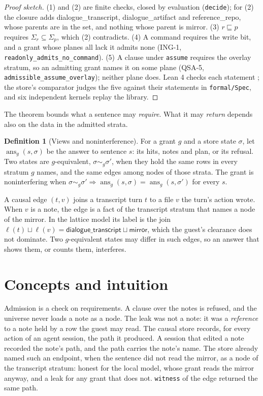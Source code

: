 \documentclass[11pt]{article}
\theoremstyle{plain}
\theoremstyle{definition}
\newtheorem{definition}[theorem]{Definition}
\theoremstyle{remark}
\newcommand{\lean}[1]{\texttt{#1}}
\newcommand{\str}[1]{\textsf{#1}}
\begin{document}
\begin{proof}[Proof sketch]
(1) and (2) are finite checks, closed by evaluation (\lean{decide}); for (2) the closure adds
\str{dialogue\_transcript}, \str{dialogue\_artifact} and \str{reference\_repo}, whose parents are
in the set, and nothing whose parent is \str{mirror}. (3) $r \sqsubseteq p$ requires
$\Sigma_r \subseteq \Sigma_p$, which (2) contradicts. (4) A command requires the write bit, and a
grant whose planes all lack it admits none (ING-1, \lean{readonly\_admits\_no\_command}). (5) A
clause under \texttt{assume} requires the overlay stratum, so an admitting grant names it on some
plane (QSA-5, \lean{admissible\_assume\_overlay}); neither plane does. Lean 4 checks each statement
\citep{demoura2021lean4,mathlib2020}; the store's comparator judges the five against their
statements in \texttt{formal/Spec}, and six independent kernels replay the library.
\end{proof}

The theorem bounds what a sentence may \emph{require}. What it may \emph{return} depends also on
the data in the admitted strata.

\begin{definition}[Views and noninterference]
For a grant $g$ and a store state $\sigma$, let $\operatorname{ans}_g(s, \sigma)$ be the answer to
sentence $s$: its hits, notes and plan, or its refusal. Two states are $g$-equivalent,
$\sigma \sim_g \sigma'$, when they hold the same rows in every stratum $g$ names, and the same
edges among nodes of those strata. The grant is noninterfering when
$\sigma \sim_g \sigma' \Rightarrow \operatorname{ans}_g(s, \sigma) = \operatorname{ans}_g(s,
\sigma')$ for every $s$.
\end{definition}

A causal edge $(t, v)$ joins a transcript turn $t$ to a file $v$ the turn's action wrote. When $v$
is a note, the edge is a fact of the transcript stratum that names a node of the mirror. In the
lattice model its label is the join $\ell(t) \sqcup \ell(v) = \str{dialogue\_transcript} \sqcup
\str{mirror}$, which the guest's clearance does not dominate. Two $g$-equivalent states may differ
in such edges, so an answer that shows them, or counts them, interferes.

\section{Concepts and intuition}

Admission is a check on requirements. A clause over the notes is refused, and the universe never
loads a note as a node. The leak was not a note: it was a \emph{reference} to a note held by a row
the guest may read. The causal store records, for every action of an agent session, the path it
produced. A session that edited a note recorded the note's path, and the path carries the note's
name. The store already named such an endpoint, when the sentence did not read the mirror, as a
node of the transcript stratum: honest for the local model, whose grant reads the mirror anyway,
and a leak for any grant that does not. \texttt{witness} of the edge returned the same path.
\end{document}
